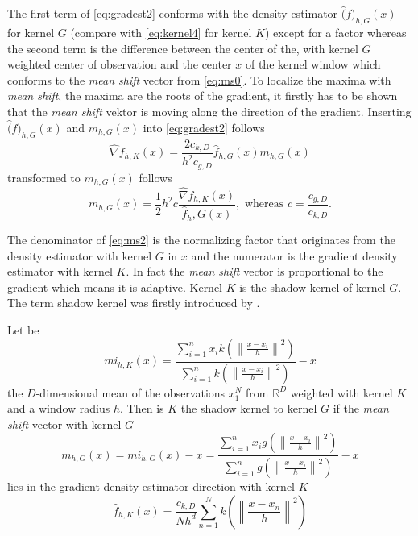 The first term of \autoref{eq:gradest2} conforms with the density estimator
$\hat(f)_{h,G}(x)$ for kernel $G$ (compare with \autoref{eq:kernel4} for kernel
$K$) except for a factor whereas the second term is the difference between the
center of the, with kernel $G$ weighted center of observation and the center $x$
of the kernel window which conforms to the \emph{mean shift} vector from 
\autoref{eq:ms0}.
To localize the maxima with \emph{mean shift}, the maxima are the roots of the gradient,
it firstly has to be shown that the \emph{mean shift} vektor is moving along the 
direction of the gradient. Inserting $\hat(f)_{h,G}(x)$ and $m_{h,G}(x)$ into
\autoref{eq:gradest2} follows
\begin{equation}\label{eq:ms1}
	\hat{\nabla} f_{h,K}(x) = \frac{2c_{k,D}}{h^2c_{g,D}} 
	\hat{f}_{h,G}(x)m_{h,G}(x)
\end{equation}
transformed to $m_{h,G}(x)$ follows
\begin{equation}\label{eq:ms2}
	m_{h,G}(x) = \frac{1}{2}h^2 c 
	\frac{\hat{\nabla} f_{h,K}(x)}{\hat{f}_h,G(x)}, \textrm{ whereas } 
	c = \frac{c_{g,D}}{c_{k,D}}.
\end{equation}

The denominator of \autoref{eq:ms2} is the normalizing factor that originates 
from the density estimator with kernel $G$ in $x$ and the numerator is the 
gradient density estimator with kernel $K$. In fact the \emph{mean shift} vector
is proportional to the gradient which means it is adaptive. Kernel $K$ is the 
shadow kernel of kernel $G$. The term shadow kernel was firstly introduced by
\citeauthor{citeulike:2522867} \citep{citeulike:2522867}.

Let be
\begin{equation}\label{eq:msi}
	mi_{h,K}(x) = \frac{\sum_{i=1}^n x_i k\left(\left\lVert \frac{x - x_i}{h}
	\right\rVert^2\right)}{\sum_{i=1}^n k\left(\left\lVert \frac{x - x_i}{h}
	\right\rVert^2\right)} -x
\end{equation}
the $D$-dimensional mean of the observations $x_1^N$ from $\mathbb{R}^D$ 
weighted with kernel $K$ and a window radius $h$. Then is $K$ the 
shadow kernel to kernel $G$ if the \emph{mean shift} vector with kernel $G$
\begin{equation}\label{eq:msi2}	
	m_{h,G}(x) = mi_{h,G}(x) - x = 
	\frac{\sum_{i=1}^n x_i g\left(\left\lVert \frac{x - x_i}{h}
	\right\rVert^2\right)}{\sum_{i=1}^n g\left(\left\lVert \frac{x - x_i}{h}
	\right\rVert^2\right)} -x
\end{equation}
lies in the gradient density estimator direction with kernel $K$
\begin{equation}\label{eq:msi3}
	\hat{f}_{h,K}(x) = \frac{c_{k,D}}{Nh^d}
	\sum_{n = 1}^N k\left(\left\lVert \frac{x-x_n}{h} \right\rVert^2\right)
\end{equation}

